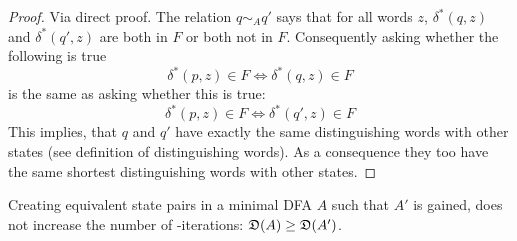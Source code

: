 \begin{proof}
    Via direct proof. The relation $q \sim_A q'$ says that for all words $z$, $\delta^*(q,z)$ and $\delta^*(q',z)$ are both in $F$ or both not in $F$. Consequently asking whether the following is true
    \[
    	\delta^*(p,z)\in F \Leftrightarrow \delta^*(q,z)\in F
    \]
    is the same as asking whether this is true:
    \[
    	\delta^*(p,z)\in F \Leftrightarrow \delta^*(q',z)\in F
    \]
    This implies, that $q$ and $q'$ have exactly the same distinguishing words with other states (see definition of distinguishing words). As a consequence they too have the same shortest distinguishing words with other states.
\end{proof}

\begin{theorem}
	Creating equivalent state pairs in a minimal DFA $A$ such that $A'$ is gained, does not increase the number of \CompDist-iterations: $\mathfrak{D}(A) \ge \mathfrak{D}(A')$.
\end{theorem}

